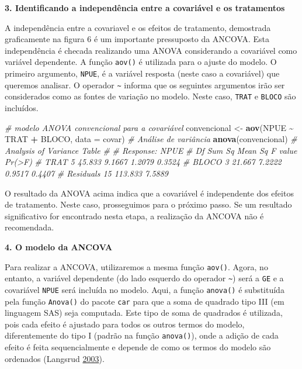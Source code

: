 \documentclass[
]{book}
\makeatletter
\newenvironment{Shaded}{\begin{snugshade}}{\end{snugshade}}
\newcommand{\CommentTok}[1]{\textcolor[rgb]{0.56,0.35,0.01}{\textit{#1}}}
\newcommand{\DataTypeTok}[1]{\textcolor[rgb]{0.13,0.29,0.53}{#1}}
\newcommand{\KeywordTok}[1]{\textcolor[rgb]{0.13,0.29,0.53}{\textbf{#1}}}
\newcommand{\NormalTok}[1]{#1}
\newcommand{\OperatorTok}[1]{\textcolor[rgb]{0.81,0.36,0.00}{\textbf{#1}}}
\newcommand{\StringTok}[1]{\textcolor[rgb]{0.31,0.60,0.02}{#1}}
\numberwithin{equation}{section}
\newcommand{\indf}[1]{\index[function]{#1@\texttt{#1()}|ST}}
\newcommand{\indt}[1]{\index{#1|ST}}
\makeatother
\begin{document}
\textbf{3. Identificando a independência entre a covariável e os tratamentos}

A independência entre a covariavel e os efeitos de tratamento, demostrada graficamente na figura 6 é um importante pressuposto da ANCOVA. Esta independência é checada realizando uma ANOVA\indt{ANOVA} considerando a covariável como variável dependente. A função \texttt{aov()} é utilizada para o ajuste do modelo. O primeiro argumento, \texttt{NPUE}, é a variável resposta (neste caso a covariável) que queremos analisar. O operador \texttt{\textasciitilde{}} informa que os seguintes argumentos irão ser considerados como as fontes de variação no modelo. Neste caso, \texttt{TRAT} e \texttt{BLOCO} são incluídos.

\begin{Shaded}
\begin{Highlighting}[]
\CommentTok{\# modelo ANOVA convencional para a covariável}
\NormalTok{convencional \textless{}{-}}\StringTok{ }\KeywordTok{aov}\NormalTok{(NPUE }\OperatorTok{\textasciitilde{}}\StringTok{  }\NormalTok{TRAT }\OperatorTok{+}\StringTok{ }\NormalTok{BLOCO, }\DataTypeTok{data =}\NormalTok{ covar)}
\CommentTok{\# Análise de variância}
\KeywordTok{anova}\NormalTok{(convencional) }
\CommentTok{\# Analysis of Variance Table}
\CommentTok{\# }
\CommentTok{\# Response: NPUE}
\CommentTok{\#           Df  Sum Sq Mean Sq F value Pr(\textgreater{}F)}
\CommentTok{\# TRAT       5  45.833  9.1667  1.2079 0.3524}
\CommentTok{\# BLOCO      3  21.667  7.2222  0.9517 0.4407}
\CommentTok{\# Residuals 15 113.833  7.5889}
\end{Highlighting}
\end{Shaded}

\indf{aov}

O resultado da ANOVA\indt{ANOVA} acima indica que a covariável é independente dos efeitos de tratamento. Neste caso, prosseguimos para o próximo passo. Se um resultado significativo for encontrado nesta etapa, a realização da ANCOVA\indt{ANCOVA} não é recomendada.

\textbf{4. O modelo da ANCOVA}

Para realizar a ANCOVA, utilizaremos a mesma função \texttt{aov()}. Agora, no entanto, a variável dependente (do lado esquerdo do operador \texttt{\textasciitilde{}}) será a \texttt{GE} e a covariável \texttt{NPUE} será incluída no modelo. Aqui, a função \texttt{anova()} é substituída pela função \texttt{Anova()} do pacote \texttt{car} para que a soma de quadrado tipo III (em linguagem SAS) seja computada. Este tipo de soma de quadrados é utilizada, pois cada efeito é ajustado para todos os outros termos do modelo, diferentemente do tipo I (padrão na função \texttt{anova()}), onde a adição de cada efeito é feita sequencialmente e depende de como os termos do modelo são ordenados (Langsrud \protect\hyperlink{ref-Langsrud2003}{2003}).
\end{document}
